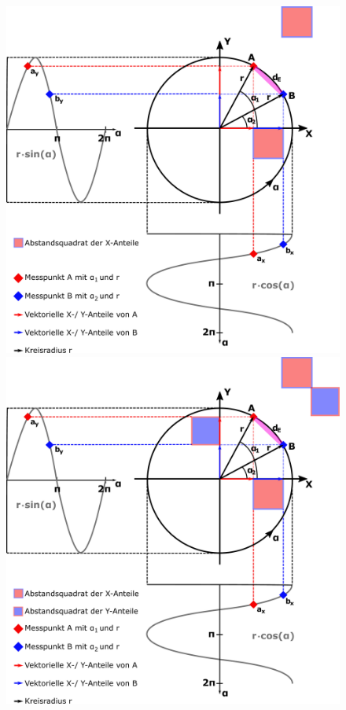 \documentclass{beamer}
\begin{document}
\begin{frame}
\begin{columns}[c]
\begin{figure}
\begin{overprint}
			\includegraphics[width=\linewidth]{images/Kreisdarstellung_Winkelabstand-3}
			\onslide<5>\includegraphics[width=\linewidth]{images/Kreisdarstellung_Winkelabstand-4}

\end{overprint}
\end{figure}
\end{columns}
\end{frame}
\end{document}

